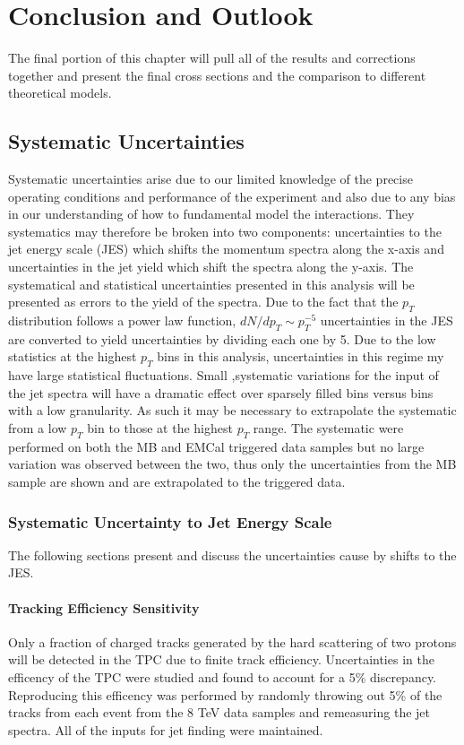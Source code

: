 \chapter{Conclusion and Outlook} \label{ch:cando}

The final portion of this chapter will pull all of the results and corrections together and present the final cross sections and the comparison to different theoretical models.  

\section{Systematic Uncertainties}

Systematic uncertainties arise due to our limited knowledge of the precise operating conditions and performance of the experiment and also due to any bias in our understanding of how to fundamental model the interactions.  They systematics may therefore be broken into two components: uncertainties to the jet energy scale (JES) which shifts the momentum spectra along the x-axis and uncertainties in the jet yield which shift the spectra along the y-axis.  The systematical and statistical uncertainties presented in this analysis will be presented as errors to the yield of the spectra.  Due to the fact that the $p_{T}$ distribution follows a power law function, $dN/dp_{T} \sim p_{T}^{-5}$ uncertainties in the JES are converted to yield uncertainties by dividing each one by 5.
Due to the low statistics at the highest $p_{T}$ bins in this analysis, uncertainties in this regime my have large statistical fluctuations.  Small ,systematic variations for the input of the jet spectra will have a dramatic effect over sparsely filled bins versus bins with a low granularity.  As such it may be necessary to extrapolate the systematic from a low $p_{T}$ bin to those at the highest $p_{T}$ range.  The systematic were performed on both the MB and EMCal triggered data samples but no large variation was observed between the two, thus only the uncertainties from the MB sample are shown and are extrapolated to the triggered data.


\subsection{Systematic Uncertainty to Jet Energy Scale}

The following sections present and discuss the uncertainties cause by shifts to the JES.

\subsubsection{Tracking Efficiency Sensitivity}
Only a fraction of charged tracks generated by the hard scattering of two protons will be detected in the TPC due to finite track efficiency.  Uncertainties in the efficency of the TPC were studied and found to account for a 5\% discrepancy\cite{Abelev:2013ala}.  Reproducing this efficency was performed by randomly throwing out 5\% of the tracks from each event from the 8 TeV data samples and remeasuring the jet spectra.  All of the inputs for jet finding were maintained.


